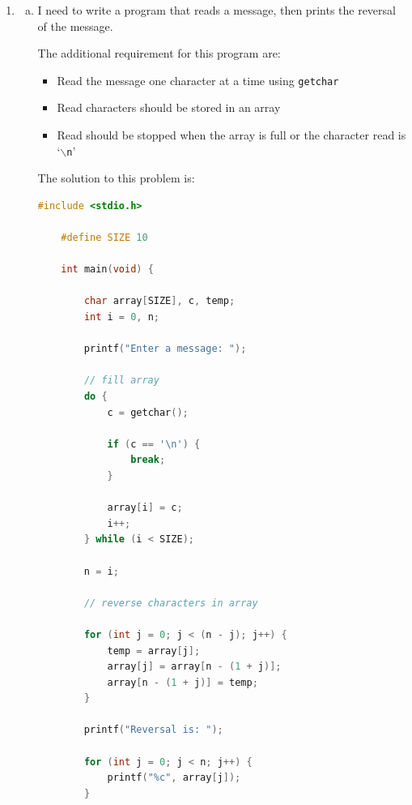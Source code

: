 \documentclass[12pt]{article}
\begin{document}
\begin{enumerate}[1.]
    \item

    \begin{enumerate}[a)]
        \item

        I need to write a program that reads a message, then prints the reversal of the message.

        \bigskip

        The additional requirement for this program are:

        \begin{itemize}
            \item Read the message one character at a time using \texttt{getchar}
            \item Read characters should be stored in an array
            \item Read should be stopped when the array is full or the character read is `\texttt{$\backslash$n}'
        \end{itemize}

        \bigskip

        The solution to this problem is:

        \bigskip

\begin{lstlisting}[language=c]
    #include <stdio.h>

    #define SIZE 10

    int main(void) {

        char array[SIZE], c, temp;
        int i = 0, n;

        printf("Enter a message: ");

        // fill array
        do {
            c = getchar();

            if (c == '\n') {
                break;
            }

            array[i] = c;
            i++;
        } while (i < SIZE);

        n = i;

        // reverse characters in array

        for (int j = 0; j < (n - j); j++) {
            temp = array[j];
            array[j] = array[n - (1 + j)];
            array[n - (1 + j)] = temp;
        }

        printf("Reversal is: ");

        for (int j = 0; j < n; j++) {
            printf("%c", array[j]);
        }


\end{lstlisting}
\end{enumerate}
\end{enumerate}
\end{document}

